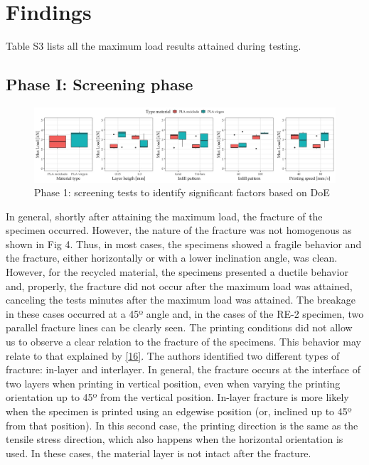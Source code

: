 \documentclass[conference,final,]{IEEEtran}
\begin{document}
\hypertarget{findings}{%
\section{Findings}\label{findings}}

Table S3 lists all the maximum load results attained during testing.

\hypertarget{phase-i-screening-phase}{%
\subsection{Phase I: Screening phase}\label{phase-i-screening-phase}}

\begin{figure}[t]
  \centering
  \includegraphics[width=\linewidth]{Figures/Phase-1.jpg}
  \caption{Phase 1: screening tests to identify significant factors based on DoE}
  \label{fig:methodology}
\end{figure}

In general, shortly after attaining the maximum load, the fracture of
the specimen occurred. However, the nature of the fracture was not
homogenous as shown in Fig 4. Thus, in most cases, the specimens showed
a fragile behavior and the fracture, either horizontally or with a lower
inclination angle, was clean. However, for the recycled material, the
specimens presented a ductile behavior and, properly, the fracture did
not occur after the maximum load was attained, canceling the tests
minutes after the maximum load was attained. The breakage in these cases
occurred at a 45º angle and, in the cases of the RE-2 specimen, two
parallel fracture lines can be clearly seen. The printing conditions did
not allow us to observe a clear relation to the fracture of the
specimens. This behavior may relate to that explained by
\protect\hyperlink{ref-Yao2019}{{[}16{]}}. The authors identified two
different types of fracture: in-layer and interlayer. In general, the
fracture occurs at the interface of two layers when printing in vertical
position, even when varying the printing orientation up to 45º from the
vertical position. In-layer fracture is more likely when the specimen is
printed using an edgewise position (or, inclined up to 45º from that
position). In this second case, the printing direction is the same as
the tensile stress direction, which also happens when the horizontal
orientation is used. In these cases, the material layer is not intact
after the fracture.
\end{document}
